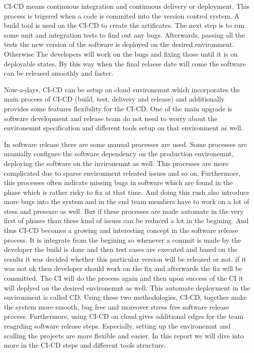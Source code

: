 CI-CD means continuous integration and continuous delivery or deployment. This process is trigered when a code is commited into the version control system. A build tool is used on the CI-CD to create the artificates. The next step is to run some unit and integration tests to find out any bugs. Afterwards, passing all the tests the new version of the software is deployed on the desired environment. Otherwise The developers will work on the bugs and fixing those until it is on deployable states. By this way when the final relaese date will come the software can be released smoothly and faster.

Now-a-days, CI-CD can be setup on cloud environemnt which incorporates the main process of CI-CD (build, test, delivery and release) and additionally provides some features flexibility for the CI-CD. One of the main upgrade is software development and release team do not need to worry about the environemnt specification and different tools setup on that environment as well.

In software release there are some manual processes are used. Some processes are manually configure the software dependency on the production environemnt, deploying the software on the invironemnt as well. This processes are more complicated due to sparse environment releated issues and so on. Furthermore, this processes often indicate missing bugs in software which are found in the phase which is rather risky to fix at that time. And doing this rush also introduce more bugs into the system and in the end team members have to work on a lot of stess and pressure as well. But if these processes are made automate in the very first of phases than these kind of issues can be reduced a lot in the begining. And thus CI-CD becomes a growing and interesting concept in the software release process. It is integrate from the begining so whenever a commit is made by the developer the build is done and then test cases are executed and based on the results it was decided whether this particular version will be released or not. if it was not ok then developer should work on the fix and afterwards the fix will be committed. The CI will do the process again and then upon success of the CI it will deplyed on the desired environemnt as well. This automate deployment in the environment is called CD. Using these two methodologies, CI-CD, together make the system more smooth, bug free and moreover stress free software release process. Furthermore, using CI-CD on cloud gives additional edges for the team reagrding software release steps. Especially, setting up the environemnt and scalling the projects are more flexible and easier. In this report we will dive into more in the CI-CD steps and different tools structure.